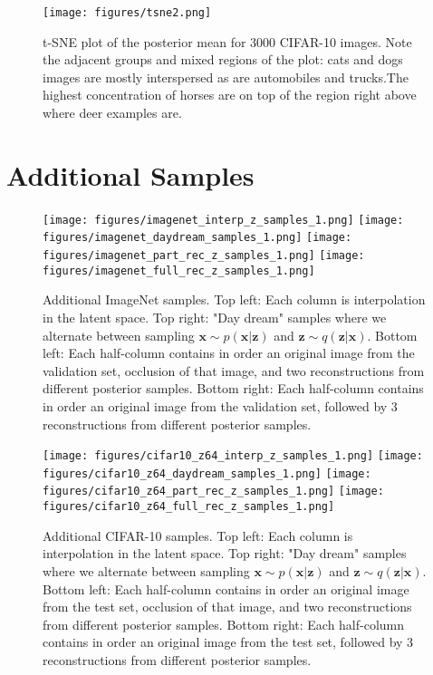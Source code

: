 \documentclass{article} \usepackage{iclr2019_conference,times}
\def\rvx{{\mathbf{x}}}
\def\rvz{{\mathbf{z}}}
\begin{document}
\begin{figure}[h!]
    \centering
    \texttt{[image: figures/tsne2.png]}
    \caption{t-SNE plot of the posterior mean for 3000 CIFAR-10 images. Note the adjacent groups and mixed regions of the plot: cats and dogs images are mostly interspersed as are automobiles and trucks.The highest concentration of horses are on top of the region right above where deer examples are.
    }
    \label{fig:tsne}    
\end{figure}

\section{Additional Samples}\label{app:samples}


\begin{figure}[h!]
    \centering
    \texttt{[image: figures/imagenet\_interp\_z\_samples\_1.png]}
    \texttt{[image: figures/imagenet\_daydream\_samples\_1.png]}
    \texttt{[image: figures/imagenet\_part\_rec\_z\_samples\_1.png]}
    \texttt{[image: figures/imagenet\_full\_rec\_z\_samples\_1.png]}
    \label{fig:more-imagenet-samez}
    \caption{Additional ImageNet samples. Top left: Each column is interpolation in the latent space.
     Top right: "Day dream" samples where we alternate between sampling $\rvx \sim p(\rvx|\rvz)$ and $\rvz \sim q(\rvz|\rvx)$.
     Bottom left: Each half-column contains in order an original image from the validation set, occlusion of
     that image, and two reconstructions from different posterior samples.
     Bottom right: Each half-column contains in order an original image from the validation set, followed by 3
     reconstructions from different posterior samples.}
\end{figure}

\begin{figure}[h!]
    \centering
    \texttt{[image: figures/cifar10\_z64\_interp\_z\_samples\_1.png]}
    \texttt{[image: figures/cifar10\_z64\_daydream\_samples\_1.png]}
    \texttt{[image: figures/cifar10\_z64\_part\_rec\_z\_samples\_1.png]}
    \texttt{[image: figures/cifar10\_z64\_full\_rec\_z\_samples\_1.png]}
    \label{fig:more-imagenet-samez}
    \caption{Additional CIFAR-10 samples. Top left: Each column is interpolation in the latent space.
     Top right: "Day dream" samples where we alternate between sampling $\rvx \sim p(\rvx|\rvz)$ and $\rvz \sim q(\rvz|\rvx)$.
     Bottom left: Each half-column contains in order an original image from the test set, occlusion of
     that image, and two reconstructions from different posterior samples.
     Bottom right: Each half-column contains in order an original image from the test set, followed by 3
     reconstructions from different posterior samples.}
\end{figure}
\end{document}
